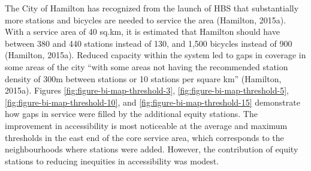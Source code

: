 \documentclass[]{elsarticle} %
\begin{document}
The City of Hamilton has recognized from the launch of HBS that
substantially more stations and bicycles are needed to service the area
(Hamilton, 2015a). With a service area of 40 sq.km, it is estimated that
Hamilton should have between 380 and 440 stations instead of 130, and
1,500 bicycles instead of 900 (Hamilton, 2015a). Reduced capacity within
the system led to gaps in coverage in some areas of the city ``with some
areas not having the recommended station density of 300m between
stations or 10 stations per square km'' (Hamilton, 2015a). Figures
\ref{fig:figure-bi-map-threshold-3},
\ref{fig:figure-bi-map-threshold-5},
\ref{fig:figure-bi-map-threshold-10}, and
\ref{fig:figure-bi-map-threshold-15} demonstrate how gaps in service
were filled by the additional equity stations. The improvement in
accessibility is most noticeable at the average and maximum thresholds
in the east end of the core service area, which corresponds to the
neighbourhoods where stations were added. However, the contribution of
equity stations to reducing inequities in accessibility was modest.
\end{document}
